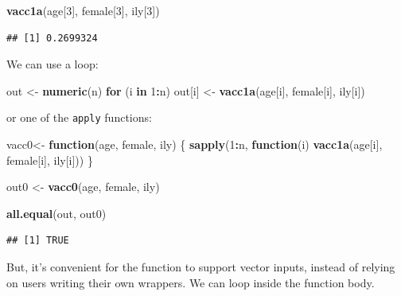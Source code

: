 \documentclass[]{book}
\newenvironment{Shaded}{\begin{snugshade}}{\end{snugshade}}
\newcommand{\KeywordTok}[1]{\textcolor[rgb]{0.13,0.29,0.53}{\textbf{#1}}}
\newcommand{\DecValTok}[1]{\textcolor[rgb]{0.00,0.00,0.81}{#1}}
\newcommand{\StringTok}[1]{\textcolor[rgb]{0.31,0.60,0.02}{#1}}
\newcommand{\ControlFlowTok}[1]{\textcolor[rgb]{0.13,0.29,0.53}{\textbf{#1}}}
\newcommand{\OperatorTok}[1]{\textcolor[rgb]{0.81,0.36,0.00}{\textbf{#1}}}
\newcommand{\NormalTok}[1]{#1}
\theoremstyle{definition}
\theoremstyle{definition}
\theoremstyle{definition}
\theoremstyle{remark}
\begin{document}
\begin{Shaded}
\begin{Highlighting}[]
\KeywordTok{vacc1a}\NormalTok{(age[}\DecValTok{3}\NormalTok{], female[}\DecValTok{3}\NormalTok{], ily[}\DecValTok{3}\NormalTok{])}
\end{Highlighting}
\end{Shaded}

\begin{verbatim}
## [1] 0.2699324
\end{verbatim}

We can use a loop:

\begin{Shaded}
\begin{Highlighting}[]
\NormalTok{out <-}\StringTok{ }\KeywordTok{numeric}\NormalTok{(n)}
\ControlFlowTok{for}\NormalTok{ (i }\ControlFlowTok{in} \DecValTok{1}\OperatorTok{:}\NormalTok{n)}
\NormalTok{  out[i] <-}\StringTok{ }\KeywordTok{vacc1a}\NormalTok{(age[i], female[i], ily[i])}
\end{Highlighting}
\end{Shaded}

or one of the \texttt{apply} functions:

\begin{Shaded}
\begin{Highlighting}[]
\NormalTok{vacc0<-}\StringTok{ }\ControlFlowTok{function}\NormalTok{(age, female, ily) \{}
  \KeywordTok{sapply}\NormalTok{(}\DecValTok{1}\OperatorTok{:}\NormalTok{n, }\ControlFlowTok{function}\NormalTok{(i) }\KeywordTok{vacc1a}\NormalTok{(age[i], female[i], ily[i]))}
\NormalTok{\}}

\NormalTok{out0 <-}\StringTok{ }\KeywordTok{vacc0}\NormalTok{(age, female, ily)}
\end{Highlighting}
\end{Shaded}

\begin{Shaded}
\begin{Highlighting}[]
\KeywordTok{all.equal}\NormalTok{(out, out0)}
\end{Highlighting}
\end{Shaded}

\begin{verbatim}
## [1] TRUE
\end{verbatim}

But, it's convenient for the function to support vector inputs, instead
of relying on users writing their own wrappers. We can loop inside the
function body.
\end{document}
